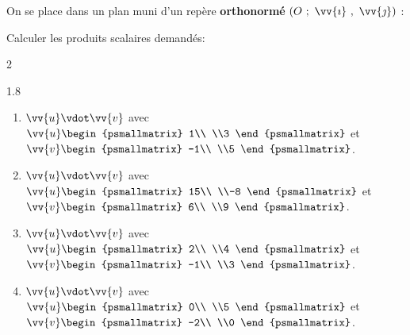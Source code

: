 \documentclass[main.tex]{subfiles}
\begin{document}
\newpage 
\begin{eBox}
On se place dans un plan muni d'un repère \textbf{orthonormé} $(O~;~\vv{\imath}~,~\vv{\jmath})$ :
\end{eBox} 
\begin{exercise} Calculer les produits scalaires demandés:
	\vspace{-0.5em}
\begin{multicols}{2}
\begin{spacing}{1.8}
\begin{enumerate}[label=\arabic*),leftmargin=*]
	\item $\vv{u}\vdot\vv{v}$ avec $ \vv{u}
	 \displaystyle\begin{psmallmatrix}
		1\\ \\3
	\end{psmallmatrix}$ et $\vv{v}\begin{psmallmatrix}
	-1\\ \\5
\end{psmallmatrix}$.  
\item $\vv{u}\vdot\vv{v}$ avec $\vv{u}\begin{psmallmatrix}
	15\\ \\-8
\end{psmallmatrix}$ et $\vv{v}\begin{psmallmatrix}
	6\\ \\9
\end{psmallmatrix}$.
\item $\vv{u}\vdot\vv{v}$ avec $\vv{u}\begin{psmallmatrix}
	2\\ \\4
\end{psmallmatrix}$ et $\vv{v}\begin{psmallmatrix}
	-1\\ \\3
\end{psmallmatrix}$.
\item $\vv{u}\vdot\vv{v}$ avec $\vv{u}\begin{psmallmatrix}
	0\\ \\5
\end{psmallmatrix}$ et $\vv{v}\begin{psmallmatrix}
	-2\\ \\0
\end{psmallmatrix}$.

\end{enumerate}
\end{spacing}
\end{multicols}
\end{exercise}
\end{document}
